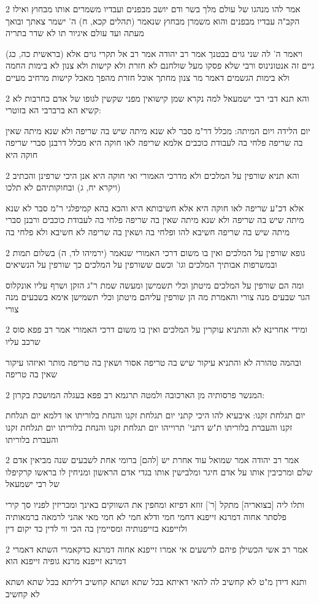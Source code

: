 \documentclass[12pt, openany]{book}
\newcommand{\sethebfont}{
\fontsize{10.5pt}{21.0pt} \selectfont
}
\newcommand{\twocol}[1]{
	{\sethebfont \begin{multicols}{2}
			#1
	\end{multicols}}	
}
\begin{document}
\twocol{אמר להו מנהגו של עולם מלך בשר ודם יושב מבפנים ועבדיו משמרים אותו מבחוץ ואילו הקב"ה עבדיו מבפנים והוא משמרן מבחוץ שנאמר (תהלים קכא, ח) ה' ישמר צאתך ובואך מעתה ועד עולם איגיור תו לא שדר בתריה
\par (בראשית כה, כג) ויאמר ה' לה שני גוים בבטנך אמר רב יהודה אמר רב אל תקרי גוים אלא גיים זה אנטונינוס ורבי שלא פסקו מעל שולחנם לא חזרת ולא קישות ולא צנון לא בימות החמה ולא בימות הגשמים דאמר מר צנון מחתך אוכל חזרת מהפך מאכל קישות מרחיב מעיים}
\twocol{והא תנא דבי רבי ישמעאל למה נקרא שמן קישואין מפני שקשין לגופו של אדם כחרבות לא קשיא הא ברברבי הא בזוטרי:
\par יום הלידה ויום המיתה: מכלל דר"מ סבר לא שנא מיתה שיש בה שריפה ולא שנא מיתה שאין בה שריפה פלחי בה לעבודת כוכבים אלמא שריפה לאו חוקה היא מכלל דרבנן סברי שריפה חוקה היא}
\twocol{והא תניא שורפין על המלכים ולא מדרכי האמורי ואי חוקה היא אנן היכי שרפינן והכתיב (ויקרא יח, ג) ובחוקותיהם לא תלכו
\par אלא דכ"ע שריפה לאו חוקה היא אלא חשיבותא היא והכא בהא קמיפלגי ר"מ סבר לא שנא מיתה שיש בה שריפה ולא שנא מיתה שאין בה שריפה פלחי בה לעבודת כוכבים ורבנן סברי מיתה שיש בה שריפה חשיבא להו ופלחי בה ושאין בה שריפה לא חשיבא ולא פלחי בה}
\twocol{גופא שורפין על המלכים ואין בו משום דרכי האמורי שנאמר (ירמיהו לד, ה) בשלום תמות ובמשרפות אבותיך המלכים וגו' וכשם ששורפין על המלכים כך שורפין על הנשיאים
\par ומה הם שורפין על המלכים מיטתן וכלי תשמישן ומעשה שמת ר"ג הזקן ושרף עליו אונקלוס הגר שבעים מנה צורי והאמרת מה הן שורפין עליהם מיטתן וכלי תשמישן אימא בשבעים מנה צורי}
\twocol{ומידי אחרינא לא והתניא עוקרין על המלכים ואין בו משום דרכי האמורי אמר רב פפא סוס שרכב עליו
\par ובהמה טהורה לא והתניא עיקור שיש בה טריפה אסור ושאין בה טריפה מותר ואיזהו עיקור שאין בה טריפה}
\twocol{המנשר פרסותיה מן הארכובה ולמטה תרגמא רב פפא בעגלה המושכת בקרון:
\par יום תגלחת זקנו: איבעיא להו היכי קתני יום תגלחת זקנו והנחת בלוריתו או דלמא יום תגלחת זקנו והעברת בלוריתו ת"ש דתני' תרוייהו יום תגלחת זקנו והנחת בלוריתו יום תגלחת זקנו והעברת בלוריתו}
\twocol{אמר רב יהודה אמר שמואל עוד אחרת יש [להם] ברומי אחת לשבעים שנה מביאין אדם שלם ומרכיבין אותו על אדם חיגר ומלבישין אותו בגדי אדם הראשון ומניחין לו בראשו קרקיפלו של רבי ישמעאל
\par ותלו ליה [בצואריה] מתקל [ר'] זוזא דפיזא ומחפין את השווקים באינך ומכריזין לפניו סך קירי פלסתר אחוה דמרנא זייפנא דחמי חמי ודלא חמי לא חמי מאי אהני לרמאה ברמאותיה ולזייפנא בזייפנותיה ומסיימין בה הכי ווי לדין כד יקום דין}
\twocol{אמר רב אשי הכשילן פיהם לרשעים אי אמרו זייפנא אחוה דמרנא כדקאמרי השתא דאמרי דמרנא זייפנא מרנא גופיה זייפנא הוא
\par ותנא דידן מ"ט לא קחשיב לה להאי דאיתא בכל שתא ושתא קחשיב דליתא בכל שתא ושתא לא קחשיב}
\end{document}
